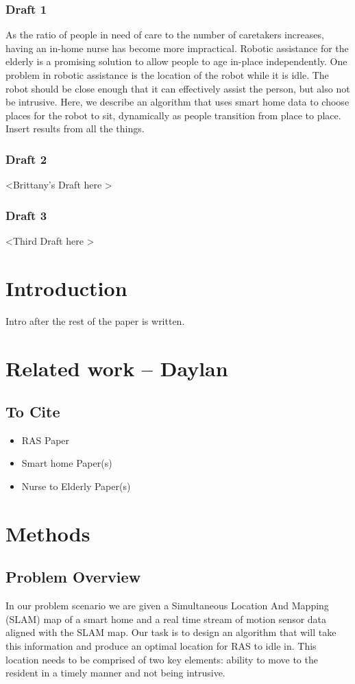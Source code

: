 \documentclass[11pt, conference, a4paper]{IEEEtran}
\begin{document}
\subsubsection{Draft 1}
As the ratio of people in need of care to the number of caretakers increases, having an in-home nurse has become more impractical. Robotic assistance for the elderly is a promising solution to allow people to age in-place independently. One problem in robotic assistance is the location of the robot while it is idle. The robot should be close enough that it can effectively assist the person, but also not be intrusive. Here, we describe an algorithm that uses smart home data to choose places for the robot to sit, dynamically as people transition from place to place. Insert results from all the things.


\subsubsection{Draft 2}
\textless Brittany's Draft here \textgreater


\subsubsection{Draft 3}
\textless Third Draft here \textgreater


\section{Introduction}
Intro after the rest of the paper is written. 


\section{Related work -- Daylan}
\subsection{To Cite}
\begin{itemize}
    \item RAS Paper
    \item Smart home Paper(s)
    \item Nurse to Elderly Paper(s)
\end{itemize}


\section{Methods}

\subsection{Problem Overview}
In our problem scenario we are given a Simultaneous Location And Mapping (SLAM) map of a smart home and a real time stream of motion sensor data aligned with the SLAM map. Our task is to design an algorithm that will take this information and produce an optimal location for RAS to idle in. This location needs to be comprised of two key elements: ability to move to the resident in a timely manner and not being intrusive. 
\end{document}
